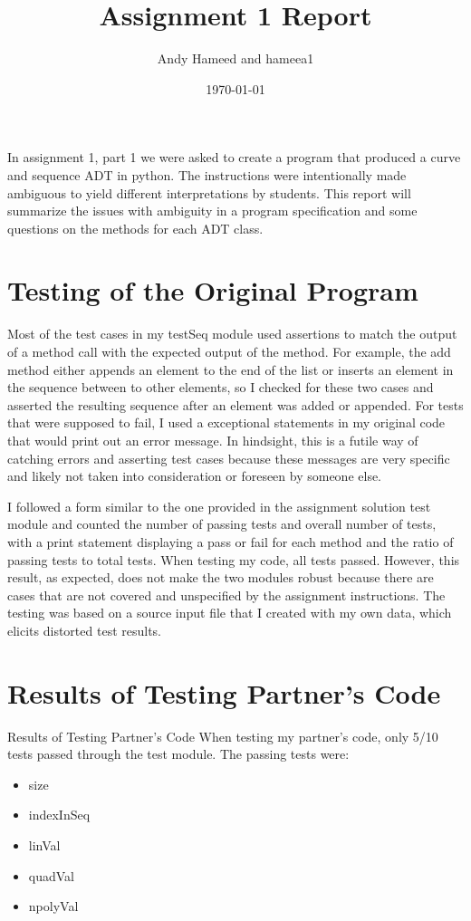 \documentclass[12pt]{article}
\title{Assignment 1 Report}
\author{Andy Hameed and hameea1}
\date{\today}
\begin{document}
\maketitle

In assignment 1, part 1 we were asked to create a program that produced a curve and sequence ADT in python. The instructions were intentionally made ambiguous to yield different interpretations by students. This report will summarize the issues with ambiguity in a program specification and some questions on the methods for each ADT class.

\section{Testing of the Original Program}

Most of the test cases in my testSeq module used assertions to match the output of a method call with the expected output of the method. For example, the add method either appends an element to the end of the list or inserts an element in the sequence between to other elements, so I checked for these two cases and asserted the resulting sequence after an element was added or appended. For tests that were supposed to fail, I used a exceptional statements in my original code that would print out an error message. In hindsight, this is a futile way of catching errors and asserting test cases because these messages are very specific and likely not taken into consideration or foreseen by someone else.

I followed a form similar to the one provided in the assignment solution test module and counted the number of passing tests and overall number of tests, with a print statement displaying a pass or fail for each method and the ratio of passing tests to total tests. When testing my code, all tests passed. However, this result, as expected, does not make the two modules robust because there are cases that are not covered and unspecified by the assignment instructions. The testing was based on a source input file that I created with my own data, which elicits distorted test results.


\section{Results of Testing Partner's Code}

Results of Testing Partner’s Code When testing my partner’s code, only 5/10 tests passed through the test module. The passing tests were:
\begin{itemize}
	\item size
	\item indexInSeq
	\item linVal
	\item quadVal
	\item npolyVal
\end{itemize}
\end{document}
